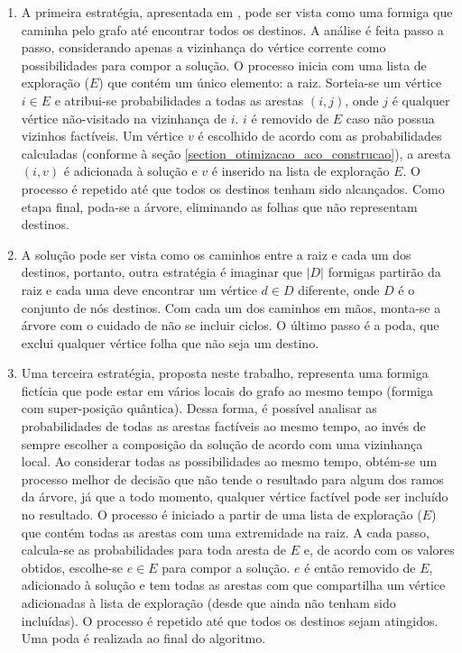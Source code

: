 \begin{enumerate}
	\item A primeira estratégia, apresentada em \cite{Pinto2005}, pode ser vista como uma formiga que caminha pelo grafo até encontrar todos os destinos. A análise é feita passo a passo, considerando apenas a vizinhança do vértice corrente como possibilidades para compor a solução. O processo inicia com uma lista de exploração ($E$) que contém um único elemento: a raiz. Sorteia-se um vértice $i \in E$ e atribui-se probabilidades a todas as arestas $(i, j)$, onde $j$ é qualquer vértice não-visitado na vizinhança de $i$. $i$ é removido de $E$ caso não possua vizinhos factíveis. Um vértice $v$ é escolhido de acordo com as probabilidades calculadas (conforme à seção \ref{section_otimizacao_aco_construcao}), a aresta $(i, v)$ é adicionada à solução e $v$ é inserido na lista de exploração $E$. O processo é repetido até que todos os destinos tenham sido alcançados. Como etapa final, poda-se a árvore, eliminando as folhas que não representam destinos.
	\item A solução pode ser vista como os caminhos entre a raiz e cada um dos destinos, portanto, outra estratégia é imaginar que $|D|$ formigas partirão da raiz e cada uma deve encontrar um vértice $d \in D$ diferente, onde $D$ é o conjunto de nós destinos. Com cada um dos caminhos em mãos, monta-se a árvore com o cuidado de não se incluir ciclos. O último passo é a poda, que exclui qualquer vértice folha que não seja um destino. %
	\item Uma terceira estratégia, proposta neste trabalho, representa uma formiga fictícia que pode estar em vários locais do grafo ao mesmo tempo (formiga com super-posição quântica). Dessa forma, é possível analisar as probabilidades de todas as arestas factíveis ao mesmo tempo, ao invés de sempre escolher a composição da solução de acordo com uma vizinhança local. Ao considerar todas as possibilidades ao mesmo tempo, obtém-se um processo melhor de decisão que não tende o resultado para algum dos ramos da árvore, já que a todo momento, qualquer vértice factível pode ser incluído no resultado. O processo é iniciado a partir de uma lista de exploração ($E$) que contém todas as arestas com uma extremidade na raiz. A cada passo, calcula-se as probabilidades para toda aresta de $E$ e, de acordo com os valores obtidos, escolhe-se $e \in E$ para compor a solução. $e$ é então removido de $E$, adicionado à solução e tem todas as arestas com que compartilha um vértice adicionadas à lista de exploração (desde que ainda não tenham sido incluídas). O processo é repetido até que todos os destinos sejam atingidos. Uma poda é realizada ao final do algoritmo.

\end{enumerate}
